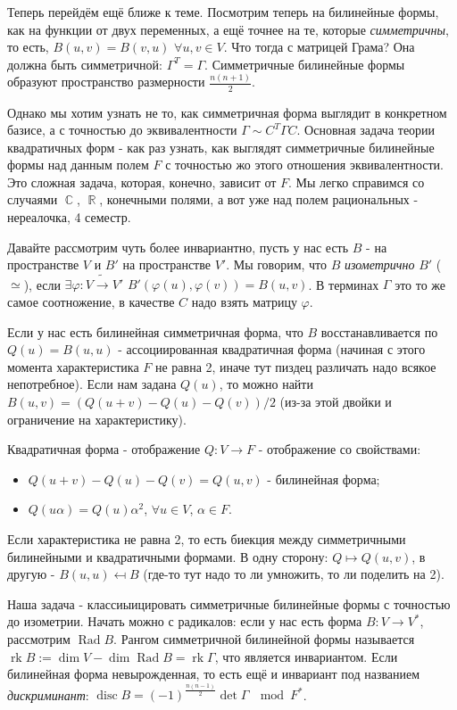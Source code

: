 \documentclass[a4paper,100pt]{article}
\theoremstyle{indented}
\theoremstyle{definition}
\theoremstyle{remark}
\DeclareMathOperator{\CC}{\mathbb{C}}
\DeclareMathOperator{\RR}{\mathbb{R}}
\DeclareMathOperator{\Rad}{Rad}
\DeclareMathOperator{\disc}{disc}
\DeclareMathOperator{\rk}{rk}
\begin{document}
Теперь перейдём ещё ближе к теме. Посмотрим теперь на билинейные формы, как на функции от двух переменных, а ещё точнее на те, которые \textit{симметричны}, то есть, $B(u, v)=B(v, u)$ $\forall u, v\in V$. Что тогда с матрицей Грама? Она должна быть симметричной: $\Gamma^T = \Gamma$. Симметричные билинейные формы образуют пространство размерности $\frac{n(n+1)}{2}$. \ 

Однако мы хотим узнать не то, как симметричная форма выглядит в конкретном базисе, а с точностью до эквивалентности $\Gamma \sim C^T \Gamma C$. Основная задача теории квадратичных форм - как раз узнать, как выглядят симметричные билинейные формы над данным полем $F$ с точностью жо этого отношения эквивалентности. Это сложная задача, которая, конечно, зависит от $F$. Мы легко справимся со случаями $\CC$, $\RR$, конечными полями, а вот уже над полем рациональных - нереалочка, 4 семестр. \ 

Давайте рассмотрим чуть более инвариантно, пусть у нас есть $B$ - на пространстве $V$ и $B'$ на пространстве $V'$. Мы говорим, что $B$ \textit{изометрично} $B'$ ($\simeq$), если $\exists \varphi: V \tilde{\rightarrow}V'$ $B'(\varphi(u), \varphi(v))=B(u, v)$. В терминах $\Gamma$ это то же самое соотножение, в качестве $C$ надо взять матрицу $\varphi$. \ 

Если у нас есть билинейная симметричная форма, что $B$ восстанавливается по $Q(u)=B(u, u)$ - ассоциированная квадратичная форма (начиная с этого момента характеристика $F$ не равна 2, иначе тут пиздец различать надо всякое непотребное). Если нам задана $Q(u)$, то можно найти $B(u, v)=(Q(u+v)-Q(u)-Q(v))/2$ (из-за этой двойки и ограничение на характеристику). \ 

Квадратичная форма - отображение $Q: V\rightarrow F$ - отображение со свойствами: 

\begin{itemize}
    \item $Q(u+v)- Q(u)-Q(v)= Q(u, v)$ - билинейная форма; 
    \item $Q(u\alpha)=Q(u)\alpha^2$, $\forall u\in V$, $\alpha \in F$. 
\end{itemize}

Если характеристика не равна 2, то есть биекция между симметричными билинейными и квадратичными формами. В одну сторону: $Q \mapsto Q(u, v)$, в другую - $B(u, u)\mapsfrom B$ (где-то тут надо то ли умножить, то ли поделить на 2). \ 

Наша задача - классиыицировать симметричные билинейные формы с точностью до изометрии. Начать можно с радикалов: если у нас есть форма $B: V\rightarrow V^*$, рассмотрим $\Rad B$. Рангом симметричной билинейной формы называется $\rk B:=\dim V - \dim \Rad B = \rk \Gamma$, что является инвариантом. Если билинейная форма невырожденная, то есть ещё и инвариант под названием \textit{дискриминант}: $\disc B = (-1)^{\frac{n(n-1)}{2}}\det \Gamma \: \mod{F^*}$. \ 
\end{document}
